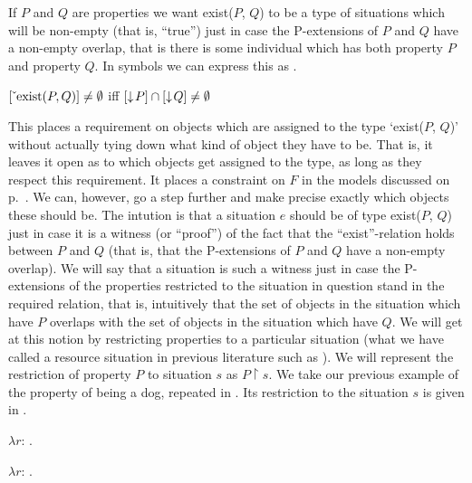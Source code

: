 If $P$ and $Q$ are properties we want exist($P$, $Q$)
to be a type of situations which will be non-empty (that is, ``true'')
just in case the P-extensions of $P$ and $Q$ have a non-empty overlap,
that is there is some individual which has both property $P$ and
property $Q$.  In symbols we can express this as \nexteg{}.
\begin{ex} 
$[\ \!\check{}\ \!\mathrm{exist}(P,Q)]\not=\emptyset$ iff
$[\downarrow\!P]\cap[\downarrow\!Q]\not=\emptyset$ 
\label{ex:constraintexist}
\end{ex} 
This places a requirement on objects which are assigned to the type `exist($P$, $Q$)'
without actually tying down what kind of object they have to be.  That
is, it leaves it open as to which objects get assigned to the type, as
long as they respect this requirement.  It places a constraint on $F$
in the models discussed on p.~\pageref{pg:models}.  We can, however,
go a step further and make precise exactly which objects these should
be.  The intution is that a situation $e$ should be of type exist($P$,
$Q$) just in case it is a witness (or ``proof'') of the fact that the
``exist''-relation holds between $P$ and $Q$ (that is, that the
P-extensions of $P$ and $Q$ have a non-empty overlap). We will say
that a situation is such a witness just in case the P-extensions of
the properties restricted to the situation in question stand in the
required relation, that is, intuitively that the set of objects in the
situation which have $P$ overlaps with the set of objects in the
situation which have $Q$.  We will get at this notion by restricting
properties to a particular situation (what we have called a
resource situation in previous literature such as
\citealp{BarwisePerry1983,Cooper1996a}). We will represent the
restriction of property $P$ to situation $s$ as $P\!\restriction\!
s$. We take our previous example of the property of being a dog,
repeated in .  Its restriction to the situation $s$ is given
in .
\begin{ex} 
\begin{subex} 
 
\item $\lambda r$: .  
 
\item $\lambda r$: .  
 
\end{subex} 
   
\end{ex} 
